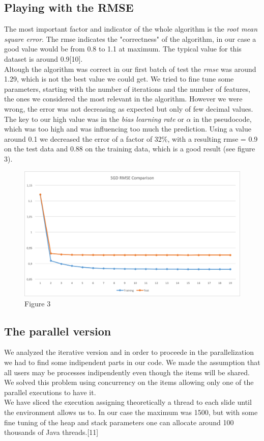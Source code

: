 \documentclass{sig-alternate-05-2015}
\begin{document}
\subsection{Playing with the RMSE}
The most important factor and indicator of the whole algorithm is the \textit{root mean
square error}. The rmse indicates the "correctness" of the algorithm, in our case
a good value would be from 0.8 to 1.1 at maximum. The typical value for this dataset
is around 0.9[10].\\
Altough the algorithm was correct in our first batch of test the \textit{rmse} was
around 1.29, which is not the best value we could get. We tried to fine tune some
parameters, starting with the number of iterations and the number of features, the ones
we considered the most relevant in the algorithm. However we were wrong, the
error was not decreasing as expected but only of few decimal values.
The key to our high value was in the \textit{bias learning rate} or $\alpha$ in the pseudocode,
which was too high and was influencing too much the prediction. Using a value around 0.1 we decreased
the error of a factor of 32$\%$, with a resulting rmse = 0.9 on the test data and 0.88 on the training data,
which is a good result (see figure 3).
\begin{figure}
    \caption{Figure 3}
    \centering
    \includegraphics[scale=0.4]{sgdrmseserial.png}
\end{figure}


\subsection{The parallel version}
We analyzed the iterative version and in order to proceede in the parallelization
we had to find some indipendent parts in our code. We made the assumption
that all users may be processes indipendently even though the items will be shared.
We solved this problem using concurrency on the items allowing only one of the
parallel executions to have it. \\
We have sliced the execution assigning theoretically a thread to each slide
until the environment allows us to. In our case the maximum was 1500, but with
some fine tuning of the heap and stack parameters one can allocate around 100 thousands
of Java threads.[11]\\
\end{document}
